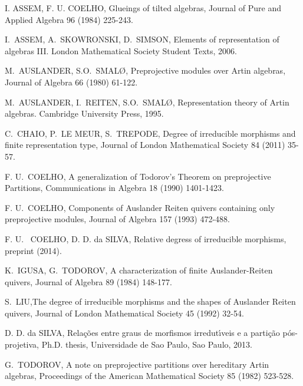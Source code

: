 \begin{thebibliography}{14}

 I. ASSEM, F. U. COELHO, Glueings of tilted algebras, Journal of Pure and Applied Algebra 96 (1984) 225-243. 

 I. \,ASSEM, A. \,SKOWRONSKI, D. \,SIMSON, Elements of representation of algebras III. London Mathematical Society Student Texts, 2006.

 M. \,AUSLANDER, S.O. \,SMAL{\O}, Preprojective modules over Artin algebras, Journal of Algebra 66 (1980) 61-122.

 M. \,AUSLANDER, I. \,REITEN, S.O. \,SMAL{\O}, Representation theory of Artin algebras. Cambridge University Press, 1995.

 C. \,CHAIO, P. \,LE MEUR, S. \,TREPODE, Degree of irreducible morphisms and finite representation type, Journal of London Mathematical Society 84 (2011) 35-57.

 F. U. \,COELHO, A generalization of Todorov's Theorem on preprojective Partitions, Communications in Algebra 18 (1990) 1401-1423.

 F. U. \,COELHO, Components of Auslander Reiten quivers containing only preprojective modules, Journal of Algebra 157 (1993) 472-488.

 F. U. \, COELHO, D. D. da SILVA, Relative degress of irreducible morphisms, preprint (2014). 

 K. \,IGUSA, G. \,TODOROV, A characterization of finite Auslander-Reiten quivers, Journal of Algebra 89 (1984) 148-177.

 S. \,LIU,The degree of irreducible morphisms and the shapes of Auslander Reiten quivers, Journal of London Mathematical Society 45 (1992) 32-54.

 D. D. da SILVA, Rela\c c\~oes entre graus de morfismos irredut\'\i veis e a parti\c c\~ao p\'os-projetiva, Ph.D. thesis, Universidade de Sao Paulo, Sao Paulo, 2013. 

 G. \,TODOROV, A note on preprojective partitions over hereditary Artin algebras, Proceedings of the American Mathematical Society 85 (1982) 523-528.

\end{thebibliography}

